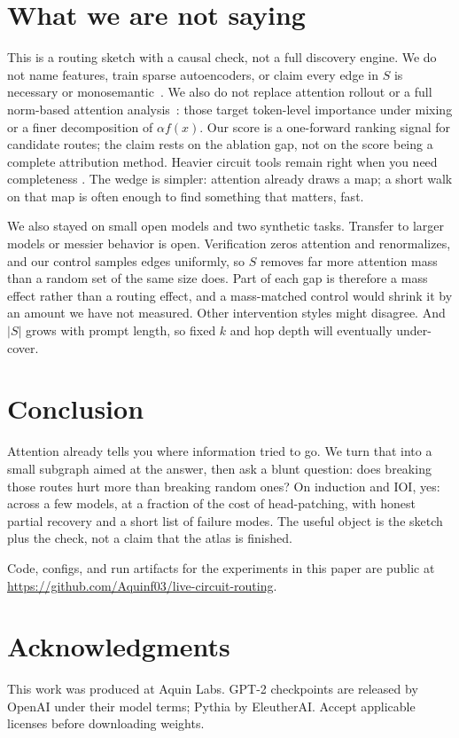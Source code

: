 \documentclass[11pt]{article}
\begin{document}
\section{What we are not saying}

This is a routing sketch with a causal check, not a full discovery engine. We
do not name features, train sparse autoencoders, or claim every edge in \(S\)
is necessary or monosemantic~\cite{marks2025sfc,ameisen2025circuittracing}.
We also do not replace attention rollout or a full norm-based attention
analysis~\cite{abnar2020rollout,kobayashi2020attn}: those target token-level
importance under mixing or a finer decomposition of \(\alpha f(x)\). Our score
is a one-forward ranking signal for candidate routes; the claim rests on the
ablation gap, not on the score being a complete attribution method. Heavier
circuit tools remain right when you need completeness
\cite{conmy2023acdc,ferrando2024ifr}. The wedge is simpler: attention already
draws a map; a short walk on that map is often enough to find something that
matters, fast.

We also stayed on small open models and two synthetic tasks. Transfer to larger
models or messier behavior is open. Verification zeros attention and renormalizes, and our control samples edges uniformly, so \(S\) removes far more attention mass than a random set of the same size does. Part of each gap is therefore a mass effect rather than a routing effect, and a mass-matched control would shrink it by an amount we have not measured. Other intervention styles might disagree. And \(|S|\) grows with
prompt length, so fixed \(k\) and hop depth will eventually under-cover.

\section{Conclusion}

Attention already tells you where information tried to go. We turn that into a
small subgraph aimed at the answer, then ask a blunt question: does breaking
those routes hurt more than breaking random ones? On induction and IOI, yes:
across a few models, at a fraction of the cost of head-patching, with honest
partial recovery and a short list of failure modes. The useful object is the
sketch plus the check, not a claim that the atlas is finished.

Code, configs, and run artifacts for the experiments in this paper are public
at \url{https://github.com/Aquinf03/live-circuit-routing}.

\section*{Acknowledgments}
This work was produced at Aquin Labs. GPT-2 checkpoints are released by OpenAI
under their model terms; Pythia by EleutherAI. Accept applicable licenses before
downloading weights.



\end{document}
